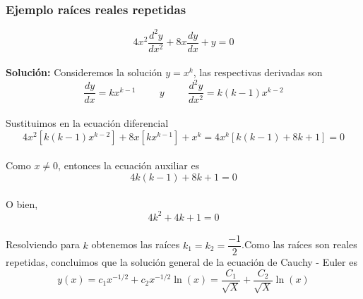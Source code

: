 \documentclass[12pt,letterpaper]{article}
\begin{document}
\subsubsection{Ejemplo raíces reales repetidas}

$$4x^{2}\frac{d^{2}y}{dx^{2}}+8x\frac{dy}{dx}+y=0$$\\
\textbf{Solución:} Consideremos la solución $y=x^{k}$, las respectivas derivadas son\\
$$\frac{dy}{dx}=kx^{k-1}\hspace{1cm}y\hspace{1cm}\frac{d^{2}y}{dx^{2}}=k(k-1)x^{k-2}$$\\
Sustituimos en la ecuación diferencial\\
$$4x^{2}\left[k(k-1)x^{k-2}\right]+8x\left[kx^{k-1}\right]+x^{k}=4x^{k}\left[k(k-1)+8k+1\right]=0$$\\
Como $x\neq0$, entonces la ecuación auxiliar es\\
$$4k(k-1)+8k+1=0$$\\
O bien,
$$4k^{2}+4k+1=0$$\\
Resolviendo para $k$ obtenemos las raíces $k_{1}=k_{2}=\dfrac{-1}{2}$.Como las raíces son reales repetidas, concluimos que la solución general de la ecuación de Cauchy - Euler es\\
$$y(x)=c_{1}x^{-1/2}+c_{2}x^{-1/2}\ln(x)=\dfrac{C_{1}}{\sqrt{X}}+\dfrac{C_{2}}{\sqrt{X}}\ln(x)$$\\
\end{document}

